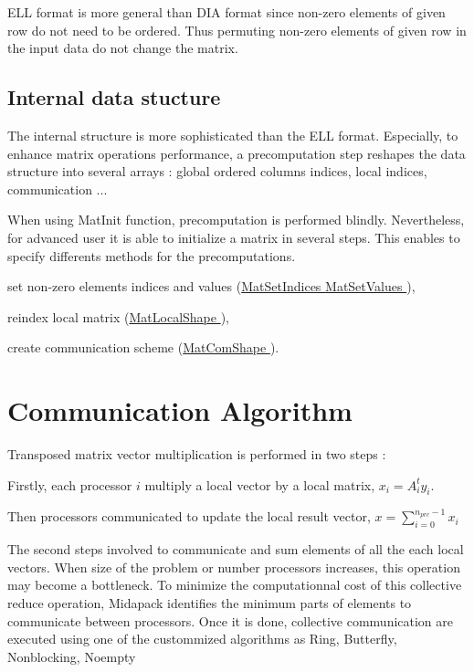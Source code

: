\begin{DoxyItemize}
\item E\-L\-L format is more general than D\-I\-A format since non-\/zero elements of given row do not need to be ordered. Thus permuting non-\/zero elements of given row in the input data do not change the matrix.
\end{DoxyItemize}\hypertarget{data_struct_parall_intern_struct}{}\subsection{Internal data stucture}\label{data_struct_parall_intern_struct}
The internal structure is more sophisticated than the E\-L\-L format. Especially, to enhance matrix operations performance, a precomputation step reshapes the data structure into several arrays \-: global ordered columns indices, local indices, communication ...

When using Mat\-Init function, precomputation is performed blindly. Nevertheless, for advanced user it is able to initialize a matrix in several steps. This enables to specify differents methods for the precomputations.
\begin{DoxyItemize}
\item set non-\/zero elements indices and values (\hyperlink{mapmat_8c_aaf26c7678367e6757392c03abd22a105}{Mat\-Set\-Indices } \hyperlink{}{Mat\-Set\-Values }),
\item reindex local matrix (\hyperlink{mapmat_8c_ae31f7ccb10cda5c97e49f640feed1ad4}{Mat\-Local\-Shape }),
\item create communication scheme (\hyperlink{}{Mat\-Com\-Shape }).
\end{DoxyItemize}

\par
 \section{Communication Algorithm}\label{algorithm}
Transposed matrix vector multiplication is performed in two steps \-:
\begin{DoxyItemize}
\item Firstly, each processor $ i $ multiply a local vector by a local matrix, $ x_i=A_i^t y_i$.
\item Then processors communicated to update the local result vector, $ x = \sum_{i=0}^{n_{prc}-1} x_i $
\end{DoxyItemize}

The second steps involved to communicate and sum elements of all the each local vectors. When size of the problem or number processors increases, this operation may become a bottleneck. To minimize the computationnal cost of this collective reduce operation, Midapack identifies the minimum parts of elements to communicate between processors. Once it is done, collective communication are executed using one of the custommized algorithms as Ring, Butterfly, Nonblocking, Noempty

